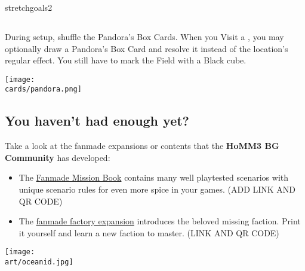 \begin{multicols*}{2}
\begin{expansion}{stretchgoals2}
  \subsection*{}
  During setup, shuffle the Pandora's Box Cards.
  When you Visit a , you may optionally draw a Pandora's Box Card and resolve it instead of the location's regular effect.
  You still have to mark the Field with a Black cube.

  \medskip
  \begin{center}
    \texttt{[image: \\cards/pandora.png]}
  \end{center}
\end{expansion}

\vspace*{1em}
\subsection*{You haven't had enough yet?}
Take a look at the fanmade expansions or contents that the \textbf{HoMM3 BG Community} has developed:
  \begin{itemize}
    \item The \href{https://github.com/qwrtln/Homm3BG-mission-book}{Fanmade Mission Book} contains many well playtested scenarios with unique scenario rules for even more spice in your games. (ADD LINK AND QR CODE)
	\item The \href{https://github.com/piotrbruzda/Homm3BG-FactoryRulebook}{fanmade factory expansion} introduces the beloved missing faction. Print it yourself and learn a new faction to master. (LINK AND QR CODE)
  \end{itemize}



\columnbreak

\texttt{[image: \\art/oceanid.jpg]}

\end{multicols*}

